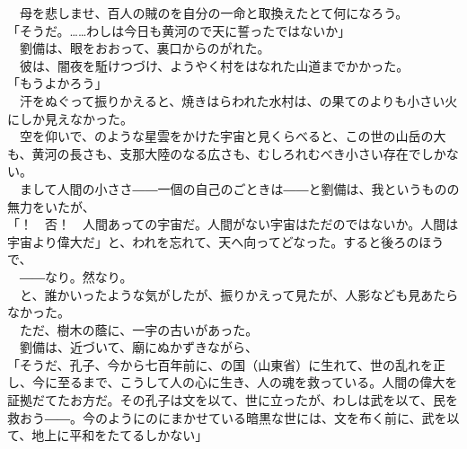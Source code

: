 \documentclass[
  paper=a5,
  fontsize=10pt,
  jafontsize=9.5pt,
  tate,                  %
  open_bracket_pos=nibu, %
]{jlreq}
\begin{document}
　母を悲しませ、百人の賊のを自分の一命と取換えたとて何になろう。\\


「そうだ。……わしは今日も黄河ので天に誓ったではないか」\\


　劉備は、眼をおおって、裏口からのがれた。\\


　彼は、闇夜を駈けつづけ、ようやく村をはなれた山道までかかった。\\


「もうよかろう」\\


　汗をぬぐって振りかえると、焼きはらわれた水村は、の果てのよりも小さい火にしか見えなかった。\\


　空を仰いで、のような星雲をかけた宇宙と見くらべると、この世の山岳の大も、黄河の長さも、支那大陸のなる広さも、むしろれむべき小さい存在でしかない。\\


　まして人間の小ささ――一個の自己のごときは――と劉備は、我というものの無力をいたが、\\


「！　否！　人間あっての宇宙だ。人間がない宇宙はただのではないか。人間は宇宙より偉大だ」と、われを忘れて、天へ向ってどなった。すると後ろのほうで、\\


　――なり。然なり。\\


　と、誰かいったような気がしたが、振りかえって見たが、人影なども見あたらなかった。\\


　ただ、樹木の蔭に、一宇の古いがあった。\\


　劉備は、近づいて、廟にぬかずきながら、\\


「そうだ、孔子、今から七百年前に、の国（山東省）に生れて、世の乱れを正し、今に至るまで、こうして人の心に生き、人の魂を救っている。人間の偉大を証拠だてたお方だ。その孔子は文を以て、世に立ったが、わしは武を以て、民を救おう――。今のようにのにまかせている暗黒な世には、文を布く前に、武を以て、地上に平和をたてるしかない」\\
\end{document}
